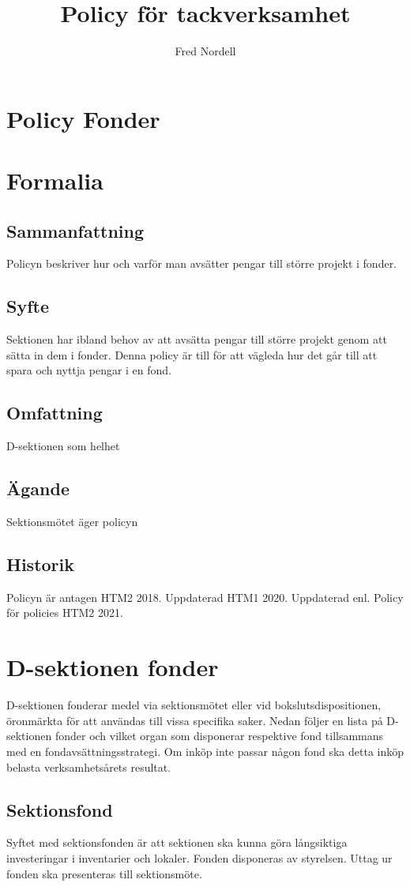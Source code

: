 \documentclass{dsekprotokoll}
\title{Policy för tackverksamhet}
\author{Fred Nordell}
\begin{document}
\section*{Policy Fonder}
\section{Formalia}
\subsection{Sammanfattning}
Policyn beskriver hur och varför man avsätter pengar till större projekt i fonder.
\subsection{Syfte}
Sektionen har ibland behov av att avsätta pengar till större projekt genom att sätta in dem i fonder.
Denna policy är till för att vägleda hur det går till att spara och nyttja pengar i en fond.
\subsection{Omfattning}
D-sektionen som helhet
\subsection{Ägande}
Sektionsmötet äger policyn
\subsection{Historik}
Policyn är antagen HTM2 2018.
Uppdaterad HTM1 2020.
Uppdaterad enl. Policy för policies HTM2 2021.

\section{D-sektionen fonder}
D-sektionen fonderar medel via sektionsmötet eller vid bokslutsdispositionen, öronmärkta för
att användas till vissa specifika saker. Nedan följer en lista på D-sektionen fonder och vilket organ som disponerar respektive fond tillsammans med en fondavsättningsstrategi. Om inköp inte passar
någon fond ska detta inköp belasta verksamhetsårets resultat.

\subsection{Sektionsfond}
Syftet med sektionsfonden är att sektionen ska kunna göra långsiktiga investeringar i inventarier och lokaler. Fonden disponeras av styrelsen. Uttag ur fonden ska presenteras
till sektionsmöte.
\end{document}
